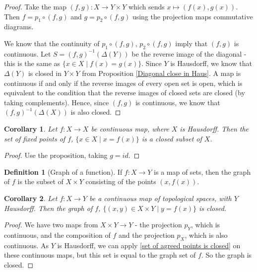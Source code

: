 \documentclass{article}
\theoremstyle{definition}
\newtheorem{defn}{Definition}[section]
\theoremstyle{plain}%
\newtheorem*{cor}{Corollary}
\theoremstyle{remark}
\newcommand{\cross}{\times}
\begin{document}
\begin{proof}
    Take the map $(f,g) : X \to Y \times Y$ which sends $x \mapsto (f(x), g(x))$. Then $f = p_1 \circ (f,g)$ and $g = p_2 \circ (f,g)$ using the projection maps commutative diagrams. 
    
    
    We know that the continuity of $p_1 \circ (f,g)$, $p_2 \circ (f,g)$ imply that $(f,g)$ is continuous. Let $S = (f,g)^{-1}(\Delta(Y))$ be the reverse image of the diagonal - this is the same as $\{x \in X \;|\; f(x) = g(x)\}$.
    Since $Y$ is Hausdorff, we know that $\Delta(Y)$ is closed in $Y \times Y$ from Proposition \ref{Diagonal close in Haus}. A map is continuous if and only if the reverse images of every open set is open, which is equivalent to the condition that the reverse images of closed sets are closed (by taking complements). Hence, since $(f,g)$ is continuous, we know that $(f,g)^{-1}(\Delta(X))$ is also closed.
\end{proof}

\begin{cor}
    Let $f: X \to X$ be continuous map, where $X$ is Hausdorff. Then the set of fixed points of $f$, $\{x \in X \; | \; x = f(x)\}$ is a closed subset of $X$.
\end{cor}

\begin{proof}
    Use the proposition, taking $g = id$.
\end{proof}

\begin{defn}[Graph of a function]
    If $f:X \to Y$ is a map of sets, then the graph of $f$ is the subset of $X \times Y$ consisting of the points $(x, f(x))$.
\end{defn}

\begin{cor}
    Let $f : X \to Y$ be a continuous map of topological spaces, with $Y$ Hausdorff. Then the graph of $f$, $\{(x,y) \in X \times Y\; | \; y = f(x)\}$ is closed.
\end{cor}

\begin{proof}
    We have two maps from $X \cross Y \to Y$ - the projection $p_Y$, which is continuous, and the composition of $f$ and the projection $p_X$, which is also continuous. As $Y$ is Hausdorff, we can apply \ref{set of agreed points is closed} on these continuous maps, but this set is equal to the graph set of $f$. So the graph is closed.
\end{proof}
\end{document}
